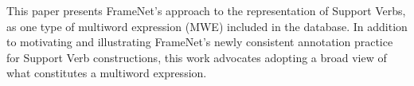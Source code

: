 This paper presents FrameNet's approach to the representation of Support Verbs, as one type of multiword expression (MWE) included in the database. In addition to motivating and illustrating FrameNet's newly consistent annotation practice for Support Verb constructions, this work advocates adopting a broad view of what constitutes a multiword expression.
